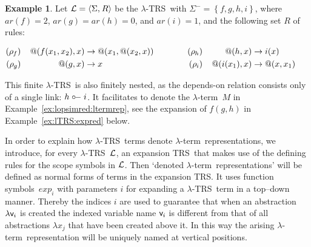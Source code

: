 \documentclass[
submission
]{dmtcs-episciences-tampered}
\makeatletter
\newcommand{\fap}[2]{#1({#2})}
\newcommand{\bfap}[3]{{#1}({#2},\hspace*{0.05pt}{#3})}
\newcommand{\indap}[2]{#1 _{#2}}
\newcommand{\supap}[2]{#1 ^{#2}}
\newcommand{\nb}{\nobreakdash}
\newcommand{\tuple}[1]{\langle #1 \rangle}
\newcommand{\tuplespace}{\hspace*{0.5pt}}
\newcommand{\pair}[2]{\tuple{#1, \tuplespace #2}}
\newcommand{\setexp}[1]{\left\{{#1}\right\}}
\newcommand{\avar}{x}
\newcommand{\avari}{\indap{\avar}}
\newcommand{\asig}{\Sigma}
\newcommand{\asigmin}{\supap{\asig}{-}}
\newcommand{\arules}{R}
\newcommand{\alTRS}{{\cal L}}
\newcommand{\TRS}{TRS}
\newcommand{\sarity}{\textit{ar}}
\newcommand{\arityof}{\fap{\sarity}}
\newcommand{\sfolapp}{@}
\newcommand{\folapp}{\bfap{\sfolapp}}
\newcommand{\afovar}{\mathsf{v}}
\newcommand{\afovari}[1]{\indap{\afovar}{\hspace*{-0.25pt}#1}}
\newcommand{\afoscopesym}{f}
\newcommand{\bfoscopesym}{g}
\newcommand{\cfoscopesym}{h}
\newcommand{\dfoscopesym}{i}
\newcommand{\afoscope}{\fap{\afoscopesym}}
\newcommand{\dfoscope}{\fap{\dfoscopesym}}
\newcommand{\ruleof}[1]{\indap{\rho}{\hspace*{-0.3pt}#1}}
\newcommand{\smyleftspoon}{\hbox{${\circ}\kern-1.3pt{\relbar}$}}
\newcommand{\sdependson}{\smyleftspoon}
\newcommand{\dependson}{\mathrel{\sdependson}}
\newcommand{\alter}{M}
\newcommand{\sred}{\to}
\newcommand{\red}{\mathrel{\sred}}
\newcommand{\sexpand}{\textit{exp}}
\newcommand{\sexpandi}{\indap{\sexpand}}
\newcommand{\lambdaterm}{$\lambda$\nb-term}
\newcommand{\lTRS}{$\lambda$\hspace*{-0.5pt}\nb-\hspace*{-0.5pt}\TRS}
\theoremstyle{plain}
\theoremstyle{definition}
\newtheorem{example}[theorem]{Example}
\makeatother
\begin{document}
\begin{example}\label{ex:lTRS}
  Let $\alTRS = \pair{\asig}{\arules}$ be the \lTRS\ 
  with $\asigmin = \setexp{ \afoscopesym, \bfoscopesym, \cfoscopesym, \dfoscopesym }$,
  where $\arityof{\afoscopesym} = 2$, $\arityof{\bfoscopesym} = \arityof{\cfoscopesym} = 0$, and $\arityof{\dfoscopesym} = 1$,
and the following set $\arules$ of rules:
  \begin{center}
    $
  \begin{alignedat}{4}
    (\ruleof{\afoscopesym}) & \;\;\;\; & 
    \folapp{\afoscope{\avari{1},\avari{2}}}{\avar}
      & {} \red 
    \folapp{\avari{1}}{\folapp{\avari{2}}{\avar}}
    & \qquad\qquad
    (\ruleof{\cfoscopesym}) & \;\;\;\; &
    \folapp{\cfoscopesym}{\avar} 
      & {} \red
    \dfoscope{\avar}
    \\
    (\ruleof{\bfoscopesym}) & \;\;\;\; & 
    \folapp{\bfoscopesym}{\avar}
      & {} \red
    \avar
    &
    (\ruleof{\dfoscopesym}) & \;\;\;\; &
    \folapp{\dfoscope{\avari{1}}}{\avar}
      & {} \red
    \folapp{\avar}{\avari{1}}        
  \end{alignedat}
    $
  \end{center}  
This finite \lTRS\
  is also finitely nested, as the depends-on relation consists only of a single link: $\cfoscopesym \dependson \dfoscopesym$.  
  It facilitates to denote the \lambdaterm~$\alter$ in Example~\ref{ex:lopsimred:ltermrep},
  see the expansion of $\afoscope{\bfoscopesym,\cfoscopesym}$ in Example~\ref{ex:lTRS:expred} below. 
\end{example}  


In order to explain how \lTRS\ terms denote \lambdaterm\ representations, we introduce, for every \lTRS~$\alTRS$, 
an expansion \TRS\ that makes use of the defining rules for the scope symbols in $\alTRS$. 
Then `denoted \lambdaterm\ representations' will be defined as normal forms of terms in the expansion \TRS.
It uses function symbols~$\sexpandi{i}$ with parameters $i$ 
for expanding a \lTRS\ term in a top--down manner.
Thereby the indices $i$ are used to guarantee that when an abstraction $\lambda\afovari{i}$ is created 
the indexed variable name $\afovari{i}$ is different from that of all abstractions $\lambda\avari{j}$ that have been created above it. 
In this way the arising \lambdaterm\ representation will be uniquely named at vertical positions. 
\end{document}
